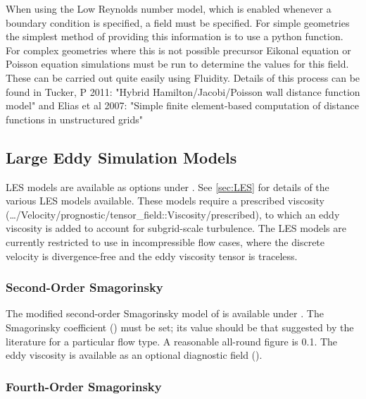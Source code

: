 When using the Low Reynolds number model, which is enabled whenever a
 boundary condition is specified, a  field
must be specified. For simple geometries the simplest method of providing this information
is to use a python function. For complex geometries where this is not possible precursor
Eikonal equation or Poisson equation simulations must be run to determine the values for
this field. These can be carried out quite easily using Fluidity. Details of this process
can be found in Tucker, P 2011: "Hybrid Hamilton/Jacobi/Poisson wall distance function
model" and Elias et al 2007: "Simple finite element-based computation of distance
functions in unstructured grids"

\subsection{Large Eddy Simulation Models}

LES models are available as options under . See \ref{sec:LES} for details of the various LES models available. These models require a prescribed viscosity (\ldots/Velocity/prognostic/tensor\_field::Viscosity/prescribed), to which an eddy viscosity is added to account for subgrid-scale turbulence. The LES models are currently restricted to use in incompressible flow cases, where the discrete velocity is divergence-free and the eddy viscosity tensor is traceless.

\subsubsection{Second-Order Smagorinsky}

The modified second-order Smagorinsky model of \citet{bentham2003} is available under . The Smagorinsky coefficient () must be set; its value should be that suggested by the literature for a particular flow type. A reasonable all-round figure is 0.1. The eddy viscosity is available as an optional diagnostic field ().

\subsubsection{Fourth-Order Smagorinsky}

